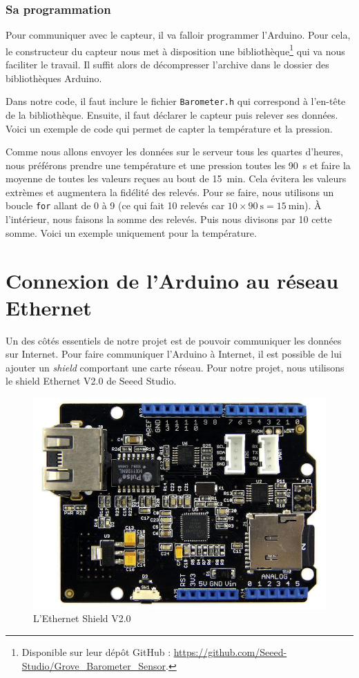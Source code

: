 \subsubsection{Sa programmation}

Pour communiquer avec le capteur, il va falloir programmer l'Arduino. Pour cela, le constructeur du capteur nous met à disposition une bibliothèque\footnote{Disponible sur leur dépôt GitHub : \url{https://github.com/Seeed-Studio/Grove_Barometer_Sensor}.} qui va nous faciliter le travail. Il suffit alors de décompresser l'archive dans le dossier des bibliothèques Arduino.

Dans notre code, il faut inclure le fichier \verb-Barometer.h- qui correspond à l'en-tête de la bibliothèque. Ensuite, il faut déclarer le capteur puis relever ses données. Voici un exemple de code qui permet de capter la température et la pression.


\Espace

Comme nous allons envoyer les données sur le serveur tous les quartes d'heures, nous préférons prendre une température et une pression toutes les \SI{90}{\second} et faire la moyenne de toutes les valeurs reçues au bout de \SI{15}{\minute}. Cela évitera les valeurs extrèmes et augmentera la fidélité des relevés. Pour se faire, nous utilisons un boucle \verb-for- allant de 0 à 9 (ce qui fait 10 relevés car $10 \times \SI{90}{\second} = \SI{15}{\minute}$). À l'intérieur, nous faisons la somme des relevés. Puis nous divisons par 10 cette somme. Voici un exemple uniquement pour la température.


\section{Connexion de l'Arduino au réseau Ethernet}

Un des côtés essentiels de notre projet est de pouvoir communiquer les données sur Internet. Pour faire communiquer l'Arduino à Internet, il est possible de lui ajouter un \emph{shield} comportant une carte réseau. Pour notre projet, nous utilisons le shield Ethernet V2.0 de Seeed Studio.

\begin{figure}
	\centering
	\includegraphics[width=.4\linewidth]{Images/Ethernet_Shield_V2-0}
	\caption{L'Ethernet Shield V2.0}
\end{figure}

